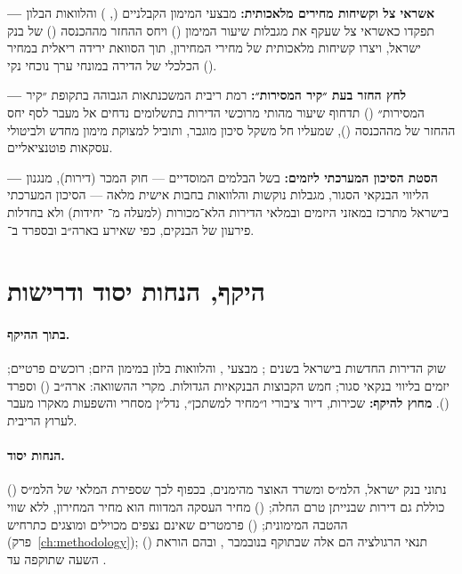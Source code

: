 \begin{researchquestion}
\textbf{ — אשראי צל וקשיחות מחירים מלאכותית:} מבצעי המימון הקבלניים (, ) והלוואות הבלון תפקדו כאשראי צל  שעקף את מגבלות שיעור המימון () ויחס ההחזר מההכנסה () של בנק ישראל, ויצרו קשיחות מלאכותית של מחירי המחירון, תוך הסוואת ירידה ריאלית במחיר הכלכלי של הדירה במונחי ערך נוכחי נקי ().

\medskip
\textbf{ — לחץ החזר בעת ״קיר המסירות״:} רמת ריבית המשכנתאות הגבוהה בתקופת ״קיר המסירות״ () תדחוף שיעור מהותי מרוכשי הדירות בתשלומים נדחים אל מעבר לסף יחס ההחזר של  מההכנסה (), שמעליו חל משקל סיכון מוגבר, ותוביל למצוקת מימון מחדש  ולביטולי עסקאות פוטנציאליים.

\medskip
\textbf{ — הסטת הסיכון המערכתי ליזמים:} בשל הבלמים המוסדיים — חוק המכר (דירות), מנגנון הליווי הבנקאי הסגור, מגבלות  נוקשות והלוואות בחבות אישית מלאה  — הסיכון המערכתי בישראל מתרכז במאזני היזמים ובמלאי הדירות הלא־מכורות (למעלה מ־ יחידות) ולא בחדלות פירעון של הבנקים, כפי שאירע בארה״ב ובספרד ב־.
\end{researchquestion}

\section{היקף, הנחות יסוד ודרישות}
\label{sec:ch1-scope}

\paragraph{בתוך ההיקף.} שוק הדירות החדשות בישראל בשנים ; מבצעי ,  והלוואות בלון במימון היזם; רוכשים פרטיים; יזמים בליווי בנקאי סגור; חמש הקבוצות הבנקאיות הגדולות. מקרי ההשוואה: ארה״ב () וספרד (). \textbf{מחוץ להיקף:} שכירות, דיור ציבורי ו״מחיר למשתכן״, נדל״ן מסחרי והשפעות מאקרו מעבר לערוץ הריבית.

\paragraph{הנחות יסוד.} () נתוני בנק ישראל, הלמ״ס ומשרד האוצר מהימנים, בכפוף לכך שספירת המלאי של הלמ״ס כוללת גם דירות שבנייתן טרם החלה; () מחיר העסקה המדווח הוא מחיר המחירון, ללא שווי ההטבה המימונית; () פרמטרים שאינם נצפים מכוילים ומוצגים כתרחיש (פרק~\ref{ch:methodology}); () תנאי הרגולציה הם אלה שבתוקף בנובמבר , ובהם הוראת השעה שתוקפה עד  \cite{boi_circular2816}.

